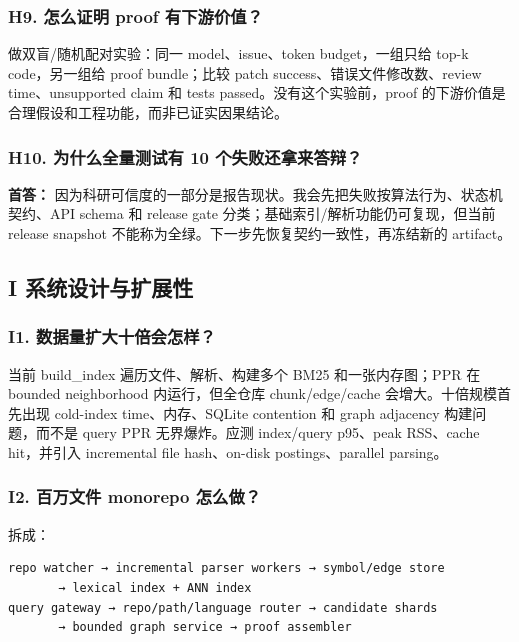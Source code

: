 \documentclass[UTF8,12pt,openany]{ctexbook}
\begin{document}
\subsubsection{H9. 怎么证明 proof 有下游价值？}

做双盲/随机配对实验：同一 model、issue、token budget，一组只给 top-k code，另一组给 proof bundle；比较 patch success、错误文件修改数、review time、unsupported claim 和 tests passed。没有这个实验前，proof 的下游价值是合理假设和工程功能，而非已证实因果结论。\par

\subsubsection{H10. 为什么全量测试有 10 个失败还拿来答辩？}

\textbf{首答：} 因为科研可信度的一部分是报告现状。我会先把失败按算法行为、状态机契约、API schema 和 release gate 分类；基础索引/解析功能仍可复现，但当前 release snapshot 不能称为全绿。下一步先恢复契约一致性，再冻结新的 artifact。\par

\subsection{I 系统设计与扩展性}

\subsubsection{I1. 数据量扩大十倍会怎样？}

当前 build\_index 遍历文件、解析、构建多个 BM25 和一张内存图；PPR 在 bounded neighborhood 内运行，但全仓库 chunk/edge/cache 会增大。十倍规模首先出现 cold-index time、内存、SQLite contention 和 graph adjacency 构建问题，而不是 query PPR 无界爆炸。应测 index/query p95、peak RSS、cache hit，并引入 incremental file hash、on-disk postings、parallel parsing。\par

\subsubsection{I2. 百万文件 monorepo 怎么做？}

拆成：\par

\begin{lstlisting}
repo watcher → incremental parser workers → symbol/edge store
       → lexical index + ANN index
query gateway → repo/path/language router → candidate shards
       → bounded graph service → proof assembler
\end{lstlisting}
\end{document}
